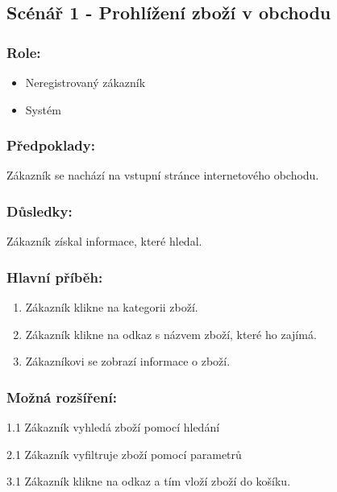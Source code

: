 \documentclass[11pt,twoside,a4paper]{book}
\begin{document}
\subsection{Scénář 1 - Prohlížení zboží v obchodu}
\subsubsection*{Role:}

\begin{itemize}
\item Neregistrovaný zákazník
\item Systém
\end{itemize}

\subsubsection*{Předpoklady:}

Zákazník se nachází na vstupní stránce internetového obchodu.

\subsubsection*{Důsledky:}

Zákazník získal informace, které hledal.

\subsubsection*{Hlavní příběh:}
\begin{enumerate}
\item Zákazník klikne na kategorii zboží.
\item Zákazník klikne na odkaz s názvem zboží, které ho zajímá.
\item Zákazníkovi se zobrazí informace o zboží.
\end{enumerate}

\subsubsection*{Možná rozšíření:}

\begin{description}
\item 1.1 Zákazník vyhledá zboží pomocí hledání
\item 2.1 Zákazník vyfiltruje zboží pomocí parametrů
\item 3.1 Zákazník klikne na odkaz  a tím vloží zboží do košíku.
\end{description}
\end{document}

